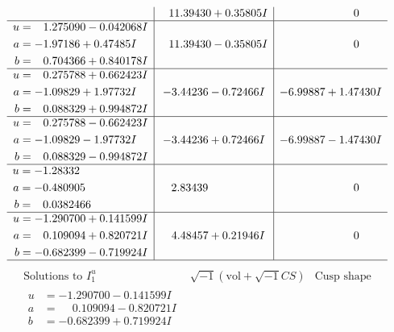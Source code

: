 \documentclass[1p]{elsarticle_modified}
\theoremstyle{definition}
\newcommand{\I}{\sqrt{-1}}
\begin{document}
$$\begin{array}{c|c|c}
 & \phantom{-}11.39430 + 0.35805 I & \phantom{-0.000000 } 0 \\ \hline\begin{aligned}
u &= \phantom{-}1.275090 - 0.042068 I \\
a &= -1.97186 + 0.47485 I \\
b &= \phantom{-}0.704366 + 0.840178 I\end{aligned}
 & \phantom{-}11.39430 - 0.35805 I & \phantom{-0.000000 } 0 \\ \hline\begin{aligned}
u &= \phantom{-}0.275788 + 0.662423 I \\
a &= -1.09829 + 1.97732 I \\
b &= \phantom{-}0.088329 + 0.994872 I\end{aligned}
 & -3.44236 - 0.72466 I & -6.99887 + 1.47430 I \\ \hline\begin{aligned}
u &= \phantom{-}0.275788 - 0.662423 I \\
a &= -1.09829 - 1.97732 I \\
b &= \phantom{-}0.088329 - 0.994872 I\end{aligned}
 & -3.44236 + 0.72466 I & -6.99887 - 1.47430 I \\ \hline\begin{aligned}
u &= -1.28332\phantom{ +0.000000I} \\
a &= -0.480905\phantom{ +0.000000I} \\
b &= \phantom{-}0.0382466\phantom{ +0.000000I}\end{aligned}
 & \phantom{-}2.83439\phantom{ +0.000000I} & \phantom{-0.000000 } 0 \\ \hline\begin{aligned}
u &= -1.290700 + 0.141599 I \\
a &= \phantom{-}0.109094 + 0.820721 I \\
b &= -0.682399 - 0.719924 I\end{aligned}
 & \phantom{-}4.48457 + 0.21946 I & \phantom{-0.000000 } 0\\
 \hline 
 \end{array}$$\newpage$$\begin{array}{c|c|c}  
\text{Solutions to }I^u_{1}& \I (\text{vol} + \sqrt{-1}CS) & \text{Cusp shape}\\
 \hline 
\begin{aligned}
u &= -1.290700 - 0.141599 I \\
a &= \phantom{-}0.109094 - 0.820721 I \\
b &= -0.682399 + 0.719924 I\end{aligned}

\end{array}$$
\end{document}
